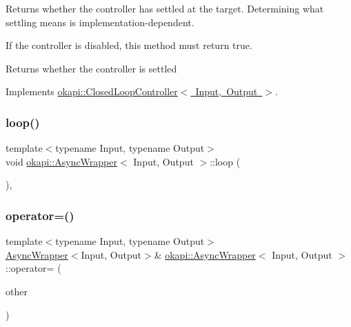 Returns whether the controller has settled at the target. Determining what settling means is implementation-\/dependent.

If the controller is disabled, this method must return true.

\begin{DoxyReturn}{Returns}
whether the controller is settled 
\end{DoxyReturn}


Implements \mbox{\hyperlink{classokapi_1_1ClosedLoopController_aed7aa0e94b6474c28314f8517d6cb4d8}{okapi\+::\+Closed\+Loop\+Controller$<$ Input, Output $>$}}.

\mbox{\label{classokapi_1_1AsyncWrapper_aebaec0e97543204889293256ba7bec4a}} 
\subsubsection{\texorpdfstring{loop()}{loop()}}
{\footnotesize\ttfamily template$<$typename Input, typename Output$>$ \\
void \mbox{\hyperlink{classokapi_1_1AsyncWrapper}{okapi\+::\+Async\+Wrapper}}$<$ Input, Output $>$\+::loop (\begin{DoxyParamCaption}{ }\end{DoxyParamCaption})\hspace{0.3cm}{\ttfamily [inline]}, {\ttfamily [protected]}}

\mbox{\label{classokapi_1_1AsyncWrapper_a6c58083a3bfbeb836cc9a10b23e4bc11}} 
\subsubsection{\texorpdfstring{operator=()}{operator=()}}
{\footnotesize\ttfamily template$<$typename Input, typename Output$>$ \\
\mbox{\hyperlink{classokapi_1_1AsyncWrapper}{Async\+Wrapper}}$<$Input, Output$>$\& \mbox{\hyperlink{classokapi_1_1AsyncWrapper}{okapi\+::\+Async\+Wrapper}}$<$ Input, Output $>$\+::operator= (\begin{DoxyParamCaption}\item[{\mbox{\hyperlink{classokapi_1_1AsyncWrapper}{Async\+Wrapper}}$<$ Input, Output $>$ \&\&}]{other }\end{DoxyParamCaption})\hspace{0.3cm}{\ttfamily [delete]}}

